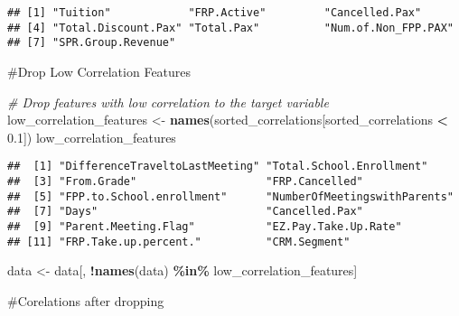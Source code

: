 \documentclass[
]{article}
\newenvironment{Shaded}{\begin{snugshade}}{\end{snugshade}}
\newcommand{\CommentTok}[1]{\textcolor[rgb]{0.56,0.35,0.01}{\textit{#1}}}
\newcommand{\FloatTok}[1]{\textcolor[rgb]{0.00,0.00,0.81}{#1}}
\newcommand{\FunctionTok}[1]{\textcolor[rgb]{0.13,0.29,0.53}{\textbf{#1}}}
\newcommand{\NormalTok}[1]{#1}
\newcommand{\OtherTok}[1]{\textcolor[rgb]{0.56,0.35,0.01}{#1}}
\newcommand{\SpecialCharTok}[1]{\textcolor[rgb]{0.81,0.36,0.00}{\textbf{#1}}}
\begin{document}
\begin{verbatim}
## [1] "Tuition"            "FRP.Active"         "Cancelled.Pax"     
## [4] "Total.Discount.Pax" "Total.Pax"          "Num.of.Non_FPP.PAX"
## [7] "SPR.Group.Revenue"
\end{verbatim}

\#Drop Low Correlation Features

\begin{Shaded}
\begin{Highlighting}[]
\CommentTok{\# Drop features with low correlation to the target variable}
\NormalTok{low\_correlation\_features }\OtherTok{\textless{}{-}} \FunctionTok{names}\NormalTok{(sorted\_correlations[sorted\_correlations }\SpecialCharTok{\textless{}} \FloatTok{0.1}\NormalTok{])}
\NormalTok{low\_correlation\_features}
\end{Highlighting}
\end{Shaded}

\begin{verbatim}
##  [1] "DifferenceTraveltoLastMeeting" "Total.School.Enrollment"      
##  [3] "From.Grade"                    "FRP.Cancelled"                
##  [5] "FPP.to.School.enrollment"      "NumberOfMeetingswithParents"  
##  [7] "Days"                          "Cancelled.Pax"                
##  [9] "Parent.Meeting.Flag"           "EZ.Pay.Take.Up.Rate"          
## [11] "FRP.Take.up.percent."          "CRM.Segment"
\end{verbatim}

\begin{Shaded}
\begin{Highlighting}[]
\NormalTok{data }\OtherTok{\textless{}{-}}\NormalTok{ data[, }\SpecialCharTok{!}\FunctionTok{names}\NormalTok{(data) }\SpecialCharTok{\%in\%}\NormalTok{ low\_correlation\_features]}
\end{Highlighting}
\end{Shaded}

\#Corelations after dropping
\end{document}
